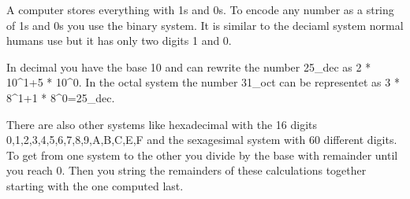 
A computer stores everything with 1s and 0s. To encode any number as a string of 1s and 0s you use the binary system. It is similar to the deciaml system normal humans use but it has only two digits 1 and 0.

In decimal you have the base 10 and can rewrite the number 25\_dec as 2 * 10\^{}1+5 * 10\^{}0. In the octal system the number 31\_oct can be representet as 3 * 8\^{}1+1 * 8\^{}0=25\_dec.

There are also other systems like hexadecimal with the 16 digits 0,1,2,3,4,5,6,7,8,9,A,B,C,E,F and the sexagesimal system with 60 different digits. To get from one system to the other you divide by the base with remainder until you reach 0. Then you string the remainders of these calculations together starting with the one computed last.


